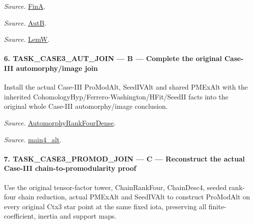 \documentclass[11pt,a4paper]{article}
\numberwithin{equation}{section}
\theoremstyle{remark}\newtheorem{remark}[theorem]{Remark}
\begin{document}
\emph{Source.} \href{https://github.com/CocoSgt/riemann-hypothesis-lean/blob/7cbf7a0c32fca1badf05931879a37c3f8a2b03b4/src/Development/AutomorphicArithmetic/AutomorphicVarieties/AutomorphicCases/AutomorphyUnramifiedCoefficients.lean#L12-L13}{FinA}.

\emph{Source.} \href{https://github.com/CocoSgt/riemann-hypothesis-lean/blob/7cbf7a0c32fca1badf05931879a37c3f8a2b03b4/src/Development/AutomorphicArithmetic/AutomorphicVarieties/AutomorphicCases/AutomorphyUnramifiedCoefficients.lean#L15-L17}{AutB}.

\emph{Source.} \href{https://github.com/CocoSgt/riemann-hypothesis-lean/blob/7cbf7a0c32fca1badf05931879a37c3f8a2b03b4/src/Development/AutomorphicArithmetic/AutomorphicVarieties/AutomorphicCases/AutomorphyUnramifiedCoefficients.lean#L19-L22}{LemW}.



\paragraph{6. TASK\_\allowbreak CASE3\_\allowbreak AUT\_\allowbreak JOIN — B — Complete the original Case-III automorphy/image join}

Install the actual Case-III ProModAlt, SeedIVAlt and shared PMExAlt with the inherited CohomologyHyp/Ferrero-Washington/HFit/SeedII facts into the original whole Case-III automorphy/image conclusion.

\emph{Source.} \href{https://github.com/CocoSgt/riemann-hypothesis-lean/blob/7cbf7a0c32fca1badf05931879a37c3f8a2b03b4/src/Development/AutomorphicArithmetic/AutomorphicVarieties/ModularityArgument/ThresholdArguments/DenseThresholdCases/PromodularityCaseThree.lean#L43-L44}{AutomorphyRankFourDense}.

\emph{Source.} \href{https://github.com/CocoSgt/riemann-hypothesis-lean/blob/7cbf7a0c32fca1badf05931879a37c3f8a2b03b4/src/Development/AutomorphicArithmetic/AutomorphicVarieties/ModularityArgument/ThresholdArguments/DenseThresholdCases/CuFinal.lean#L44-L44}{main4\_\allowbreak alt}.



\paragraph{7. TASK\_\allowbreak CASE3\_\allowbreak PROMOD\_\allowbreak JOIN — C — Reconstruct the actual Case-III chain-to-promodularity proof}

Use the original tensor-factor tower, ChainRankFour, ChainDesc4, seeded rank-four chain reduction, actual PMExAlt and SeedIVAlt to construct ProModAlt on every original Ctx3 star point at the same fixed iota, preserving all finite-coefficient, inertia and support maps.
\end{document}
